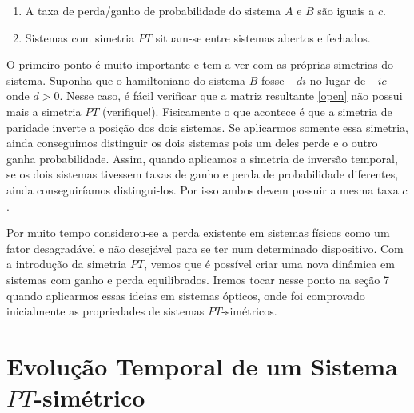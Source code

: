 \documentclass{article}
\begin{document}
\begin{enumerate}
    \item A taxa de perda/ganho de probabilidade do sistema $A$ e $B$ são iguais a $c$.
    \item Sistemas com simetria $PT$ situam-se entre sistemas abertos e fechados.
\end{enumerate}
O primeiro ponto é muito importante e tem a ver com as próprias simetrias do sistema. Suponha que o hamiltoniano do sistema $B$ fosse $-di$ no lugar de $-ic$ onde $d > 0$. Nesse caso, é fácil verificar que a matriz resultante \eqref{open} não possui mais a simetria $PT$ (verifique!). Fisicamente o que acontece é que a simetria de paridade inverte a posição dos dois sistemas. Se aplicarmos somente essa simetria, ainda conseguimos distinguir os dois sistemas pois um deles perde e o outro ganha probabilidade. Assim, quando aplicamos a simetria de inversão temporal, se os dois sistemas tivessem taxas de ganho e perda de probabilidade diferentes, ainda conseguiríamos distingui-los. Por isso ambos devem possuir a mesma taxa $c$.

Por muito tempo considerou-se a perda existente em sistemas físicos como um fator desagradável e não desejável para se ter num determinado dispositivo. Com a introdução da simetria $PT$, vemos que é possível criar uma nova dinâmica em sistemas com ganho e perda equilibrados. Iremos tocar nesse ponto na seção 7 quando aplicarmos essas ideias em sistemas ópticos, onde foi comprovado inicialmente as propriedades de sistemas $PT$-simétricos.


\section{Evolução Temporal de um Sistema $PT$-simétrico}
\end{document}
